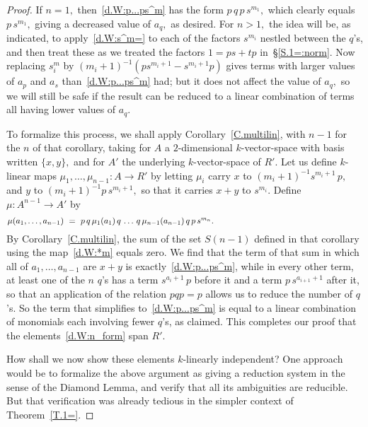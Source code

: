 \documentclass{amsart}
\begin{document}
\begin{proof}
If $n=1,$ then~\eqref{d.W:p...ps^m} has the form $p\,q\,p\,s^{m_1},$
which clearly equals $p\,s^{m_1},$ giving a decreased
value of $a_q,$ as desired.
For $n>1,$ the idea will be,
as indicated, to apply~\eqref{d.W:s^m=} to each
of the factors $s^{m_i}$ nestled between the $\!q\!$'s,
and then treat these as we treated the factors $1=ps+tp$
in~\S\ref{S.1=:norm}.
Now replacing $s^m_i$ by $(m_i+1)^{-1}(ps^{m_i+1} - s^{m_i+1}p)$
gives terms with larger values of $a_p$ and $a_s$
than~\eqref{d.W:p...ps^m} had;
but it does not affect the value of $a_q,$
so we will still be safe if the result can be reduced
to a linear combination of terms all having lower values of $a_q.$

To formalize this process, we shall apply
Corollary~\ref{C.multilin}, with $n{-}1$ for the $n$ of
that corollary, taking for $A$ a
$\!2\!$-dimensional $\!k\!$-vector-space with basis written
$\{x,y\},$ and for $A'$ the underlying $\!k\!$-vector-space of $R'.$
Let us define $\!k\!$-linear maps $\mu_1,\dots,\mu_{n-1}: A\to R'$
by letting $\mu_i$ carry $x$ to $(m_i+1)^{-1}s^{m_i+1}\,p,$
and $y$ to $(m_i+1)^{-1}p\,s^{m_i+1},$ so that it
carries $x{+}y$ to $s^{m_i}.$
Define $\mu:A^{n-1}\to A'$ by
\begin{equation}\begin{minipage}[c]{35pc}\label{d.W:*m}
$\mu(a_1,\dots,a_{n-1})\ =
\ p\,q\,\mu_1(a_1)\,q\,\dots\,q\,\mu_{n-1}(a_{n-1})\,q\,p\,s^{m_n}.$
\end{minipage}\end{equation}
By Corollary~\ref{C.multilin}, the sum of the set $S(n{-}1)$
defined in that corollary using the map~\eqref{d.W:*m} equals zero.
We find that the term of that sum in which
all of $a_1,\dots,a_{n-1}$ are $x{+}y$ is exactly~\eqref{d.W:p...ps^m},
while in every other term, at least one of the $n$ $\!q\!$'s
has a term $s^{a_i+1}\,p$ before it and a term $p\,s^{a_{i+1}+1}$
after it, so that an application of the relation $pqp=p$ allows
us to reduce the number of $\!q\!$'s.
So the term that simplifies to~\eqref{d.W:p...ps^m} is equal to
a linear combination of
monomials each involving fewer $\!q\!$'s, as claimed.
This completes our proof that the
elements~\eqref{d.W:n_form} span $R'.$

How shall we now show these elements $\!k\!$-linearly independent?
One approach would be to formalize the above argument
as giving a reduction system in the sense of the Diamond Lemma,
and verify that all its ambiguities are reducible.
But that verification was already tedious in the simpler context
of Theorem~\ref{T.1=}.


\end{proof}
\end{document}
